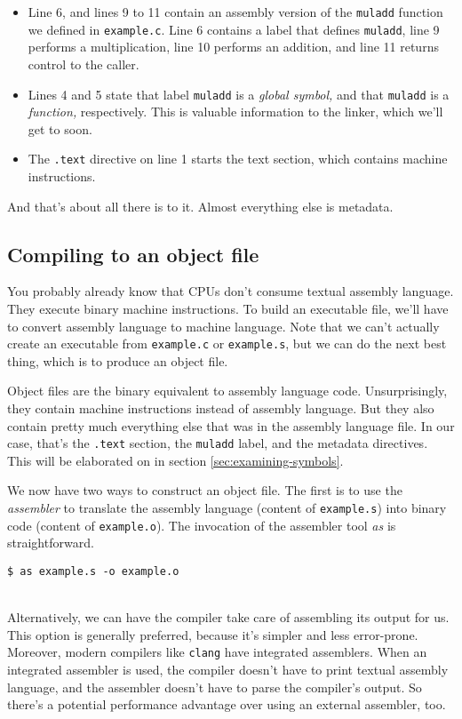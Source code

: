 \documentclass[12pt,a4paper]{article}
\newcommand{\clang}{\texttt{clang}}
\newcommand{\labelname}[1]{\texttt{#1}}
\newcommand{\functionname}[1]{\labelname{#1}}
\newcommand{\filename}[1]{\texttt{#1}}
\begin{document}
\begin{itemize}
	
	\item Line 6, and lines 9 to 11 contain an assembly version of the \functionname{muladd} function we defined in \filename{example.c}. Line 6 contains a label that defines \functionname{muladd}, line 9 performs a multiplication, line 10 performs an addition, and line 11 returns control to the caller. 
	
	\item Lines 4 and 5 state that label \functionname{muladd} is a \emph{global symbol,} and that \functionname{muladd} is a \emph{function,} respectively. This is valuable information to the linker, which we'll get to soon.
	
	\item The \texttt{.text} directive on line 1 starts the text section, which contains machine instructions. 
\end{itemize}

And that's about all there is to it. Almost everything else is metadata.

\subsection{Compiling to an object file}

You probably already know that CPUs don't consume textual assembly language. They execute binary machine instructions. To build an executable file, we'll have to convert assembly language to machine language. Note that we can't actually create an executable from \filename{example.c} or \filename{example.s}, but we can do the next best thing, which is to produce an object file.

Object files are the binary equivalent to assembly language code. Unsurprisingly, they contain machine instructions instead of assembly language. But they also contain pretty much everything else that was in the assembly language file. In our case, that's the \texttt{.text} section, the \functionname{muladd} label, and the metadata directives. This will be elaborated on in section \ref{sec:examining-symbols}.

We now have two ways to construct an object file. The first is to use the \emph{assembler} to translate the assembly language (content of  \filename{example.s}) into binary code (content of \filename{example.o}). The invocation of the assembler tool \emph{as} is straightforward.
\ \\
\begin{lstlisting}[caption=assembling \filename{example.s}]
$ as example.s -o example.o
\end{lstlisting}
\ \\
\noindent Alternatively, we can have the compiler take care of assembling its output for us. This option is generally preferred, because it's simpler and less error-prone. Moreover, modern compilers like \clang{} have integrated assemblers. When an integrated assembler is used, the compiler doesn't have to print textual assembly language, and the assembler doesn't have to parse the compiler's output. So there's a potential performance advantage over using an external assembler, too. 
\end{document}
